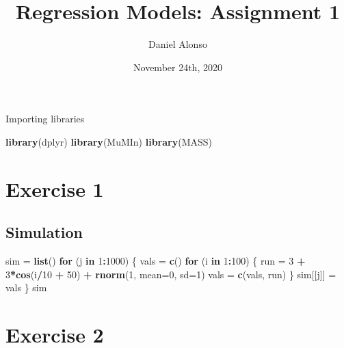\documentclass[]{article}
\title{Regression Models: Assignment 1}
\author{Daniel Alonso}
\date{November 24th, 2020}
\newenvironment{Shaded}{\begin{snugshade}}{\end{snugshade}}
\newcommand{\ControlFlowTok}[1]{\textcolor[rgb]{0.13,0.29,0.53}{\textbf{#1}}}
\newcommand{\DataTypeTok}[1]{\textcolor[rgb]{0.13,0.29,0.53}{#1}}
\newcommand{\DecValTok}[1]{\textcolor[rgb]{0.00,0.00,0.81}{#1}}
\newcommand{\KeywordTok}[1]{\textcolor[rgb]{0.13,0.29,0.53}{\textbf{#1}}}
\newcommand{\NormalTok}[1]{#1}
\newcommand{\OperatorTok}[1]{\textcolor[rgb]{0.81,0.36,0.00}{\textbf{#1}}}
\newcommand{\StringTok}[1]{\textcolor[rgb]{0.31,0.60,0.02}{#1}}
\begin{document}
\maketitle

Importing libraries

\begin{Shaded}
\begin{Highlighting}[]
\KeywordTok{library}\NormalTok{(dplyr)}
\KeywordTok{library}\NormalTok{(MuMIn)}
\KeywordTok{library}\NormalTok{(MASS)}
\end{Highlighting}
\end{Shaded}

\hypertarget{exercise-1}{%
\section{Exercise 1}\label{exercise-1}}

\hypertarget{simulation}{%
\subsection{Simulation}\label{simulation}}

\begin{Shaded}
\begin{Highlighting}[]
\NormalTok{sim =}\StringTok{ }\KeywordTok{list}\NormalTok{()}
\ControlFlowTok{for}\NormalTok{ (j }\ControlFlowTok{in} \DecValTok{1}\OperatorTok{:}\DecValTok{1000}\NormalTok{) \{}
\NormalTok{    vals =}\StringTok{ }\KeywordTok{c}\NormalTok{()}
    \ControlFlowTok{for}\NormalTok{ (i }\ControlFlowTok{in} \DecValTok{1}\OperatorTok{:}\DecValTok{100}\NormalTok{) \{}
\NormalTok{        run =}\StringTok{ }\DecValTok{3} \OperatorTok{+}\StringTok{ }\DecValTok{3}\OperatorTok{*}\KeywordTok{cos}\NormalTok{(i}\OperatorTok{/}\DecValTok{10} \OperatorTok{+}\StringTok{ }\DecValTok{50}\NormalTok{) }\OperatorTok{+}\StringTok{ }\KeywordTok{rnorm}\NormalTok{(}\DecValTok{1}\NormalTok{, }\DataTypeTok{mean=}\DecValTok{0}\NormalTok{, }\DataTypeTok{sd=}\DecValTok{1}\NormalTok{)}
\NormalTok{        vals =}\StringTok{ }\KeywordTok{c}\NormalTok{(vals, run)}
\NormalTok{    \}}
\NormalTok{    sim[[j]] =}\StringTok{ }\NormalTok{vals}
\NormalTok{\}}
\NormalTok{sim}
\end{Highlighting}
\end{Shaded}

\hypertarget{exercise-2}{%
\section{Exercise 2}\label{exercise-2}}
\end{document}
